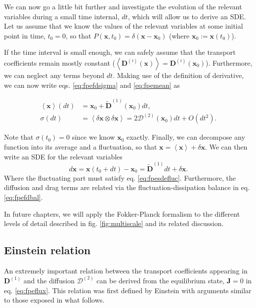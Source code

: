 \documentclass[ twoside,openright,titlepage,numbers=noenddot,%
headinclude,footinclude,cleardoublepage=empty,abstract=on,
BCOR=5mm,paper=a4,fontsize=11pt, dvipsnames
]{scrreprt}
\renewcommand{\vec}[1]{\bm{#1}}
\newcommand{\tens}[1]{\bm{\mathcal{#1}}}
\begin{document}
We can now go a little bit further and investigate the evolution of the relevant variables during a small time internal, $dt$, which will allow us to derive an \gls{SDE}.
Let us assume that we know the values of the relevant variables at some initial point in time, $t_0 = 0$, so that $P(\vec{x}, t_0) = \delta(\vec{x}-\vec{x}_0)$ (where $\vec{x}_0 :=\vec{x}(t_0)$).

If the time interval is small enough, we can safely assume that the transport coefficients remain mostly constant ($\left\langle\vec{D}^{(i)}(\vec{x}) \right\rangle = \vec{D}^{(i)}(\vec{x}_0)$). Furthermore, we can neglect any terms beyond $dt$. 
Making use of the definition of derivative, we can now write eqs. \eqref{eq:fpefdsigma} and \eqref{eq:fpemean} as

\begin{align}
    \left\langle \vec{x}\right\rangle(dt) &= \vec{x}_0 + \widetilde{\vec{D}}^{(1)}(\vec{x}_0)dt,\label{eq:fpesdemean}\\
    \tens{\sigma}(dt) &= \left\langle \delta\vec{x}\otimes\delta\vec{x}\right\rangle = 2\tens{D}^{(2)}(\vec{x}_0)dt + O(dt^2).\label{eq:fpesdefluc}
\end{align}

Note that $\tens{\sigma}(t_0) = 0$ since we know $\vec{x}_0$ exactly. Finally, we can decompose any function into its average and a fluctuation, so that $\vec{x} = \left\langle\vec{x}\right\rangle + \delta\vec{x}$. We can then write an \gls{SDE} for the relevant variables
\begin{equation}
  \label{eq:fpesde}
  d\vec{x} = \vec{x}(t_0 + dt) - \vec{x}_0 = \widetilde{\vec{D}}^{(1)}dt + \delta\vec{x}.
\end{equation}
Where the fluctuating part must satisfy eq. \eqref{eq:fpesdefluc}. Furthermore, the diffusion and drag terms are related via the fluctuation-dissipation balance in eq. \eqref{eq:fpefdbal}.

In future chapters, we will apply the Fokker-Planck formalism to the different levels of detail described in fig. \ref{fig:multiscale} and its related discussion.

\subsection{Einstein relation}\label{sec:einstein}
An extremely important relation between the transport coefficients appearing in $\vec{D}^{(1)}$ and the diffusion $\tens{D}^{(2)}$ can be derived from the equilibrium state, $\vec{J} = 0$ in eq. \eqref{eq:fpeflux}. This relation was first defined by Einstein\cite{Einstein1905} with arguments similar to those exposed in what follows.
\end{document}
